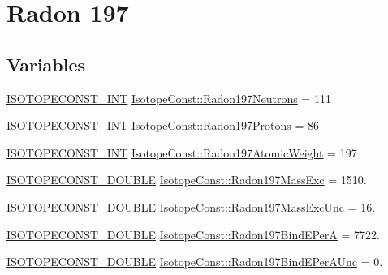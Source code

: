\hypertarget{group___isotope_const-_radon-_rn197}{}\section{Radon 197}
\label{group___isotope_const-_radon-_rn197}
\subsection*{Variables}
\begin{DoxyCompactItemize}
\item 
\mbox{\hyperlink{group___isotope_const-_macros_ga5f18360b3e99483a35c32d789e62621c}{I\+S\+O\+T\+O\+P\+E\+C\+O\+N\+S\+T\+\_\+\+I\+NT}} \mbox{\hyperlink{group___isotope_const-_radon-_rn197_ga2920967aa21e074fd4df3c7c263375fc}{Isotope\+Const\+::\+Radon197\+Neutrons}} = 111
\item 
\mbox{\hyperlink{group___isotope_const-_macros_ga5f18360b3e99483a35c32d789e62621c}{I\+S\+O\+T\+O\+P\+E\+C\+O\+N\+S\+T\+\_\+\+I\+NT}} \mbox{\hyperlink{group___isotope_const-_radon-_rn197_ga9c38625ffcd8e6b2e7fef6b23da76982}{Isotope\+Const\+::\+Radon197\+Protons}} = 86
\item 
\mbox{\hyperlink{group___isotope_const-_macros_ga5f18360b3e99483a35c32d789e62621c}{I\+S\+O\+T\+O\+P\+E\+C\+O\+N\+S\+T\+\_\+\+I\+NT}} \mbox{\hyperlink{group___isotope_const-_radon-_rn197_gaa487c73ec9438698aa2361421ec0fced}{Isotope\+Const\+::\+Radon197\+Atomic\+Weight}} = 197
\item 
\mbox{\hyperlink{group___isotope_const-_macros_ga8f45a7272ce02c0b4c65c44636ed719a}{I\+S\+O\+T\+O\+P\+E\+C\+O\+N\+S\+T\+\_\+\+D\+O\+U\+B\+LE}} \mbox{\hyperlink{group___isotope_const-_radon-_rn197_gaa77fd57b46a16ab32582d73748754188}{Isotope\+Const\+::\+Radon197\+Mass\+Exc}} = 1510.
\item 
\mbox{\hyperlink{group___isotope_const-_macros_ga8f45a7272ce02c0b4c65c44636ed719a}{I\+S\+O\+T\+O\+P\+E\+C\+O\+N\+S\+T\+\_\+\+D\+O\+U\+B\+LE}} \mbox{\hyperlink{group___isotope_const-_radon-_rn197_gaf9ccbe46a58a72493118b8cec99b02d7}{Isotope\+Const\+::\+Radon197\+Mass\+Exc\+Unc}} = 16.
\item 
\mbox{\hyperlink{group___isotope_const-_macros_ga8f45a7272ce02c0b4c65c44636ed719a}{I\+S\+O\+T\+O\+P\+E\+C\+O\+N\+S\+T\+\_\+\+D\+O\+U\+B\+LE}} \mbox{\hyperlink{group___isotope_const-_radon-_rn197_gaeb5313741312a7915831fc87d67b4a84}{Isotope\+Const\+::\+Radon197\+Bind\+E\+PerA}} = 7722.
\item 
\mbox{\hyperlink{group___isotope_const-_macros_ga8f45a7272ce02c0b4c65c44636ed719a}{I\+S\+O\+T\+O\+P\+E\+C\+O\+N\+S\+T\+\_\+\+D\+O\+U\+B\+LE}} \mbox{\hyperlink{group___isotope_const-_radon-_rn197_ga74334960b8ff093b3effb3cffcc48bba}{Isotope\+Const\+::\+Radon197\+Bind\+E\+Per\+A\+Unc}} = 0.

\end{DoxyCompactItemize}
